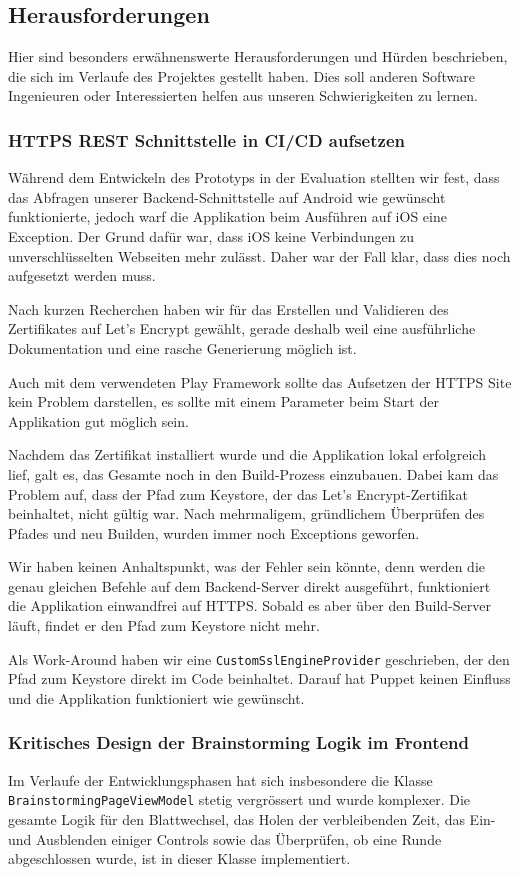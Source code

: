 \subsection{Herausforderungen}
Hier sind besonders erwähnenswerte Herausforderungen und Hürden beschrieben, die sich im Verlaufe des Projektes gestellt haben. Dies soll anderen Software Ingenieuren oder Interessierten helfen  aus unseren Schwierigkeiten zu lernen. 

\subsubsection{HTTPS REST Schnittstelle in CI/CD aufsetzen}
Während dem Entwickeln des Prototyps in der Evaluation stellten wir fest, dass das Abfragen unserer Backend-Schnittstelle auf Android wie gewünscht funktionierte, jedoch warf die Applikation beim Ausführen auf iOS eine Exception. Der Grund dafür war, dass iOS keine Verbindungen zu unverschlüsselten Webseiten mehr zulässt. Daher war der Fall klar, dass dies noch aufgesetzt werden muss.

Nach kurzen Recherchen haben wir für das Erstellen und Validieren des Zertifikates auf Let's Encrypt \cite{letsencrypt} gewählt, gerade deshalb weil eine ausführliche Dokumentation und eine rasche Generierung möglich ist. 

Auch mit dem verwendeten Play Framework sollte das Aufsetzen der HTTPS Site kein Problem darstellen, es sollte mit einem Parameter beim Start der Applikation gut möglich sein. 

Nachdem das Zertifikat installiert wurde und die Applikation lokal erfolgreich lief, galt es, das Gesamte noch in den Build-Prozess einzubauen. Dabei kam das Problem auf, dass der Pfad zum Keystore, der das Let's Encrypt-Zertifikat beinhaltet, nicht gültig war. Nach mehrmaligem, gründlichem Überprüfen des Pfades und neu Builden, wurden immer noch Exceptions geworfen.

Wir haben keinen Anhaltspunkt, was der Fehler sein könnte, denn werden die genau gleichen Befehle auf dem Backend-Server direkt ausgeführt, funktioniert die Applikation einwandfrei auf HTTPS. Sobald es aber über den Build-Server läuft, findet er den Pfad zum Keystore nicht mehr.

Als Work-Around haben wir eine \texttt{CustomSslEngineProvider} geschrieben, der den Pfad zum Keystore direkt im Code beinhaltet. Darauf hat Puppet keinen Einfluss und die Applikation funktioniert wie gewünscht.

\subsubsection{Kritisches Design der Brainstorming Logik im Frontend}\label{subsub:design-issue}
Im Verlaufe der Entwicklungsphasen hat sich insbesondere die Klasse \texttt{Brain\-storming\-PageViewModel} stetig vergrössert und wurde komplexer. Die gesamte Logik für den Blattwechsel, das Holen der verbleibenden Zeit, das Ein- und Ausblenden einiger Controls sowie das Überprüfen, ob eine Runde abgeschlossen wurde, ist in dieser Klasse implementiert. 


